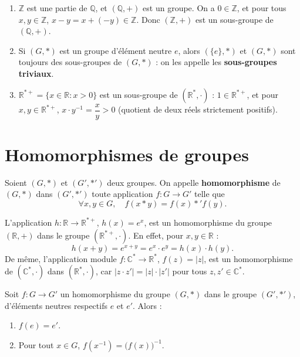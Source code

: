 \documentclass[a4paper,12pt,openany]{book}
\begin{document}
\begin{exemple}[4.5]
\begin{enumerate}
  \item $\mathbb{Z}$ est une partie de $\mathbb{Q}$, et $(\mathbb{Q},+)$
  est un groupe. On a $0\in\mathbb{Z}$, et pour tous $x,y\in\mathbb{Z}$,
  $x-y=x+(-y)\in\mathbb{Z}$. Donc $(\mathbb{Z},+)$ est un sous-groupe de
  $(\mathbb{Q},+)$.
  \item Si $(G,*)$ est un groupe d'élément neutre $e$, alors $(\{e\},*)$
  et $(G,*)$ sont toujours des sous-groupes de $(G,*)$ : on les appelle
  les \textbf{sous-groupes triviaux}.
  \item $\mathbb{R}^{*+} = \{x\in\mathbb{R} : x>0\}$ est un sous-groupe de
  $(\mathbb{R}^*,\cdot)$ : $1\in\mathbb{R}^{*+}$, et pour $x,y\in
  \mathbb{R}^{*+}$, $x\cdot y^{-1} = \dfrac{x}{y} > 0$ (quotient de deux
  réels strictement positifs).
\end{enumerate}
\end{exemple}

\section{Homomorphismes de groupes}


\begin{definition}[4.5]
Soient $(G,*)$ et $(G',*')$ deux groupes. On appelle \textbf{homomorphisme}
de $(G,*)$ dans $(G',*')$ toute application $f : G \to G'$ telle que
\[
\forall x,y \in G,\quad f(x*y) = f(x) *' f(y).
\]
\end{definition}

\begin{exemple}[4.6]
L'application $h : \mathbb{R} \to \mathbb{R}^{*+}$, $h(x)=e^x$, est un
homomorphisme du groupe $(\mathbb{R},+)$ dans le groupe
$(\mathbb{R}^{*+},\cdot)$. En effet, pour $x,y\in\mathbb{R}$ :
\[
h(x+y) = e^{x+y} = e^x \cdot e^y = h(x)\cdot h(y).
\]
De même, l'application module $f:\mathbb{C}^*\to\mathbb{R}^*$,
$f(z)=|z|$, est un homomorphisme de $(\mathbb{C}^*,\cdot)$ dans
$(\mathbb{R}^*,\cdot)$, car $|z\cdot z'| = |z|\cdot|z'|$ pour tous
$z,z'\in\mathbb{C}^*$.
\end{exemple}

\begin{theoreme}[4.4]
Soit $f : G \to G'$ un homomorphisme du groupe $(G,*)$ dans le groupe
$(G',*')$, d'éléments neutres respectifs $e$ et $e'$. Alors :
\begin{enumerate}
  \item $f(e) = e'$.
  \item Pour tout $x\in G$, $f(x^{-1}) = \big(f(x)\big)^{-1}$.
\end{enumerate}
\end{theoreme}
\end{document}
